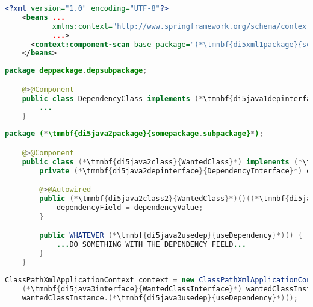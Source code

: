 \label{constructorinjectionautowire}
\begin{lstlisting}[language=XML, title={Configuration XML}]
    <?xml version="1.0" encoding="UTF-8"?>
    <beans ...
           xmlns:context="http://www.springframework.org/schema/context"
           ...>
      <context:component-scan base-package="(*\tmnbf{di5xml1package}{somepackage.subpackage}[ForestGreen]*)"/>
    </beans>
\end{lstlisting}
\begin{lstlisting}[language=Java, title={Dependency class}]
    package deppackage.depsubpackage;

    @>@Component
    public class DependencyClass implements (*\tmnbf{di5java1depinterface}{DependencyInterface}*) {
        ...
    }
\end{lstlisting}
\begin{lstlisting}[language=Java, title={Wanted class with the constructor}]
    package (*\tmnbf{di5java2package}{somepackage.subpackage}*);

    @>@Component
    public class (*\tmnbf{di5java2class}{WantedClass}*) implements (*\tmnbf{di5java2interface}{WantedClassInterface}*) {
        private (*\tmnbf{di5java2depinterface}{DependencyInterface}*) dependencyField;

        @>@Autowired
        public (*\tmnbf{di5java2class2}{WantedClass}*)()((*\tmnbf{di5java2depinterface2}{DependencyInterface}*) dependencyValue) {
            dependencyField = dependencyValue;
        }

        public WHATEVER (*\tmnbf{di5java2usedep}{useDependency}*)() {
            ...DO SOMETHING WITH THE DEPENDENCY FIELD...
        }
    }
\end{lstlisting}
\begin{lstlisting}[language=Java, title={Usage}]
    ClassPathXmlApplicationContext context = new ClassPathXmlApplicationContext("configurationFile.xml");
    (*\tmnbf{di5java3interface}{WantedClassInterface}*) wantedClassInstance = context.getBean("(*\tmnbf{di5java3beanid}{wantedClass}[ForestGreen]*)", (*\tmnbf{di5java3interface2}{WantedClassInterface}*).class);
    wantedClassInstance.(*\tmnbf{di5java3usedep}{useDependency}*)();
\end{lstlisting}
\newpage

